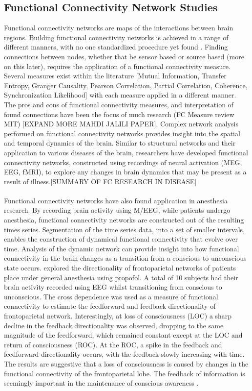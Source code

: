 \documentclass[11pt]{article}
\begin{document}
\subsection{Functional Connectivity Network Studies}
Functional connectivity networks are maps of the interactions between brain regions. Building functional connectivity networks is achieved in a range of different manners, with no one standardized procedure yet found \citep{fornito2013graph}. Finding connections between nodes, whether that be sensor based or source based (more on this later), requires the application of a functional connectivity measure. Several measures exist within the literature [Mutual Information, Transfer Entropy, Granger Causality, Pearson Correlation, Partial Correlation, Coherence, Synchronization Likelihood] with each measure applied in a different manner. The pros and cons of functional connectivity measures, and interpretation of found connections have been the focus of much research (FC Measure review MIT) [EXPAND MORE MAHDI JALILI PAPER]. Complex network analysis performed on functional connectivity networks provides insight into the spatial and temporal dynamics of the brain. Similar to structural networks and their application to various diseases of the brain, researchers have developed functional connectivity networks, constructed using recordings of neural activation (MEG, EEG, fMRI), to explore any changes in brain dynamics that may be present as a result of illness.[SUMMARY OF FC RESEARCH IN DISEASE]\\
\\ 
Functional connectivity networks have also found application in anesthesia research. By recording brain activity using M/EEG, while patients undergo anesthesia, functional connectivity networks are constructed out of the resulting times series. Segmentation of the time series data, into a set of smaller intervals, enables the construction of dynamical functional connectivity that evolve over time. Analysis of the dynamic network can provide insight into how functional connectivity in the brain changes as a transition from a conscious to unconscious state occurs. \citet{leeold} explored the directionality of frontoparietal networks of patients place under general anesthesia using propofol. A total of 10 subjects had their brain activity recorded using EEG whilst transitioning from conscious to unconscious. The cross dependence was used as a measure of functional connectivity to estimate the feedforward and feedback directionality of frontoparietal network. Interestingly, at loss of consciousness (LOC) a sharp decline in the feedback directionality was observed, dropping to the same magnitude of the feedforward, which remained constant except at the LOC and return of consciousness (ROC). At the ROC, a spike in the feedback and feedforward directionality occurs, with the feedback slowly increasing with time. The results are suggestive that a loss of consciousness is caused by changes in the functional connectivity of the frontoparietal lobe. The feedback of information is seemingly important in the maintenance of conscious awareness \citep{leeold}.\\
\end{document}

